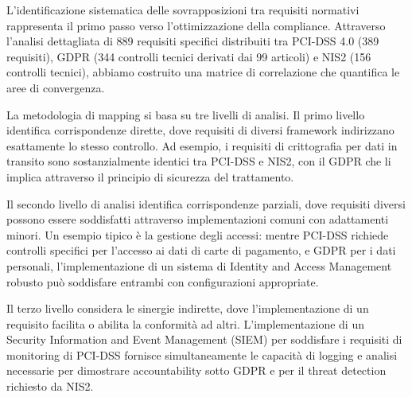 L'identificazione sistematica delle sovrapposizioni tra requisiti normativi rappresenta il primo passo verso l'ottimizzazione della compliance. Attraverso l'analisi dettagliata di 889 requisiti specifici distribuiti tra PCI-DSS 4.0 (389 requisiti), GDPR (344 controlli tecnici derivati dai 99 articoli) e NIS2 (156 controlli tecnici), abbiamo costruito una matrice di correlazione che quantifica le aree di convergenza.

La metodologia di mapping si basa su tre livelli di analisi. Il primo livello identifica corrispondenze dirette, dove requisiti di diversi framework indirizzano esattamente lo stesso controllo. Ad esempio, i requisiti di crittografia per dati in transito sono sostanzialmente identici tra PCI-DSS e NIS2, con il GDPR che li implica attraverso il principio di sicurezza del trattamento.

Il secondo livello di analisi identifica corrispondenze parziali, dove requisiti diversi possono essere soddisfatti attraverso implementazioni comuni con adattamenti minori. Un esempio tipico è la gestione degli accessi: mentre PCI-DSS richiede controlli specifici per l'accesso ai dati di carte di pagamento, e GDPR per i dati personali, l'implementazione di un sistema di Identity and Access Management robusto può soddisfare entrambi con configurazioni appropriate.

Il terzo livello considera le sinergie indirette, dove l'implementazione di un requisito facilita o abilita la conformità ad altri. L'implementazione di un Security Information and Event Management (SIEM) per soddisfare i requisiti di monitoring di PCI-DSS fornisce simultaneamente le capacità di logging e analisi necessarie per dimostrare accountability sotto GDPR e per il threat detection richiesto da NIS2.

